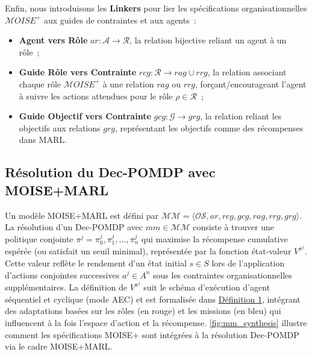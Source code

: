 \noindent Enfin, nous introduisons les \textbf{Linkers} pour lier les spécifications organisationnelles $\mathcal{M}OISE^+$ aux guides de contraintes et aux agents :
%
\begin{itemize}

  \item \textbf{Agent vers Rôle} \quad $ar: \mathcal{A} \to \mathcal{R}$, la relation bijective reliant un agent à un rôle ;
  \item \textbf{Guide Rôle vers Contrainte} \quad $rcg: \mathcal{R} \rightarrow rag \cup rrg$, la relation associant chaque rôle $\mathcal{M}OISE^+$ à une relation $rag$ ou $rrg$, forçant/encourageant l'agent à suivre les actions attendues pour le rôle $\rho \in \mathcal{R}$ ;
  \item \textbf{Guide Objectif vers Contrainte} \quad $gcg: \mathcal{G} \rightarrow grg$, la relation reliant les objectifs aux relations $grg$, représentant les objectifs comme des récompenses dans MARL.
\end{itemize}

\subsection*{Résolution du Dec-POMDP avec MOISE+MARL}

Un modèle MOISE+MARL est défini par $\mathcal{MM} = \langle \mathcal{OS}, ar, rcg, gcg, rag, rrg, grg \rangle$.
La résolution d'un Dec-POMDP avec $mm \in \mathcal{MM}$ consiste à trouver une politique conjointe $\pi^j = {\pi^j_0, \pi^j_1, \dots, \pi^j_n}$ qui maximise la récompense cumulative espérée (ou satisfait un seuil minimal), représentée par la fonction état-valeur $V^{\pi^j}$. Cette valeur reflète le rendement d'un état initial $s \in S$ lors de l'application d'actions conjointes successives $a^j \in A^n$ sous les contraintes organisationnelles supplémentaires.
%
La définition de $V^{\pi^j}$ suit le schéma d'exécution d'agent séquentiel et cyclique (mode AEC) et est formalisée dans \hyperref[eq:single_value_function]{Définition 1}, intégrant des adaptations basées sur les rôles (en rouge) et les missions (en bleu) qui influencent à la fois l'espace d'action et la récompense.
\autoref{fig:mm_synthesis} illustre comment les spécifications MOISE+ sont intégrées à la résolution Dec-POMDP via le cadre MOISE+MARL.



